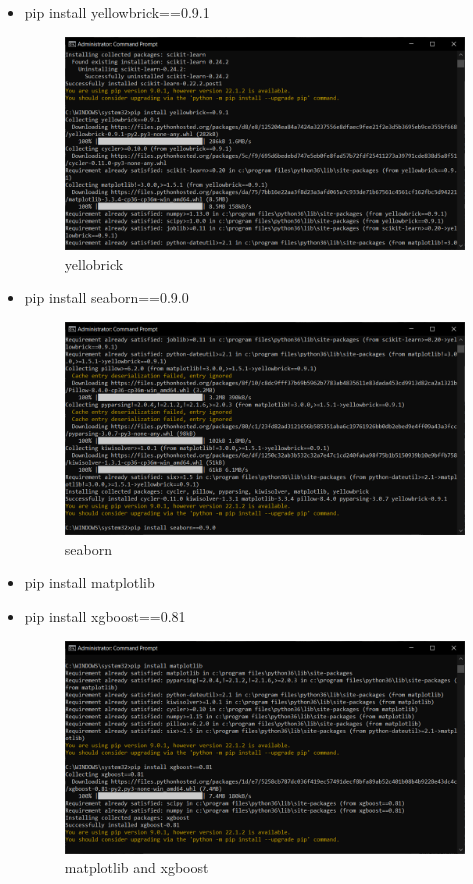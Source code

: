\documentclass[10pt]{article}
\begin{document}
\begin{itemize}
\item pip install yellowbrick==0.9.1
\begin{figure}[H]
    \begin{center}
        \includegraphics[width=0.7\linewidth, frame]{CA2-template/CM22.png}
       \caption{yellobrick \label{fig:14}}
    \end{center}
\end{figure}

\item pip install seaborn==0.9.0
\begin{figure}[H]
    \begin{center}
        \includegraphics[width=0.7\linewidth, frame]{CA2-template/CM23.png}
       \caption{seaborn \label{fig:15}}
    \end{center}
\end{figure}

\item pip install matplotlib
\item pip install xgboost==0.81
\begin{figure}[H]
    \begin{center}
        \includegraphics[width=0.7\linewidth, frame]{CA2-template/CM25.png}
       \caption{matplotlib and xgboost \label{fig:16}}
    \end{center}
\end{figure}


\end{itemize}
\end{document}
